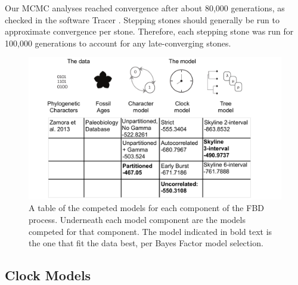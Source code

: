 \documentclass{article}
\begin{document}
Our MCMC analyses reached convergence after about 80,000 generations, as checked in the software Tracer \citep{Rambaut2018}. 
Stepping stones should generally be run to approximate convergence per stone.
Therefore, each stepping stone was run for 100,000 generations to account for any late-converging stones.

\begin{figure}
  \includegraphics[width=\textwidth]{figures/Fig2.pdf}

  \caption{A table of the competed models for each component of the FBD process. Underneath each model component are the models competed for that component. The model indicated in bold text is the one that fit the data best, per Bayes Factor model selection.}
\end{figure}


\subsection{Clock Models}
\end{document}
